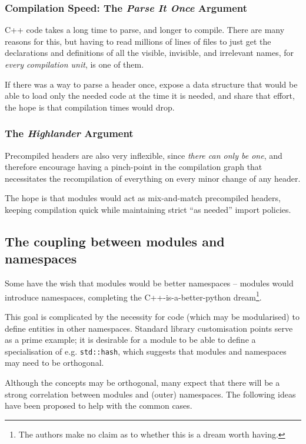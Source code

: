 \documentclass[reqno]{article}
\begin{document}
\subsubsection{Compilation Speed: The \emph{Parse It Once} Argument}

C++ code takes a long time to parse, and longer to compile. There are many
reasons for this, but having to read millions of lines of files to just get the
declarations and definitions of all the visible, invisible, and irrelevant
names, for \emph{every compilation unit}, is one of them.

If there was a way to parse a header once, expose a data structure that would be
able to load only the needed code at the time it is needed, and share that
effort, the hope is that compilation times would drop.


\subsubsection{The \emph{Highlander} Argument}

Precompiled headers are also very inflexible, since \emph{there can only be
one}, and therefore encourage having a pinch-point in the compilation graph
that necessitates the recompilation of everything on every minor change of any
header.

The hope is that modules would act as mix-and-match precompiled headers,
keeping compilation quick while maintaining strict ``as needed'' import policies.


\subsection{The coupling between modules and namespaces}

Some have the wish that modules would be better namespaces -- modules would
introduce namespaces, completing the C++-is-a-better-python dream\footnote{The
authors make no claim as to whether this is a dream worth having.}.

This goal is complicated by the necessity for code (which may be modularised)
to define entities in other namespaces. Standard library customisation points
serve as a prime example; it is desirable for a module to be able to define a
specialisation of e.g. \texttt{std::hash}, which suggests that modules and
namespaces may need to be orthogonal.

Although the concepts may be orthogonal, many expect that there will be a
strong correlation between modules and (outer) namespaces. The following ideas
have been proposed to help with the common cases.
\end{document}
